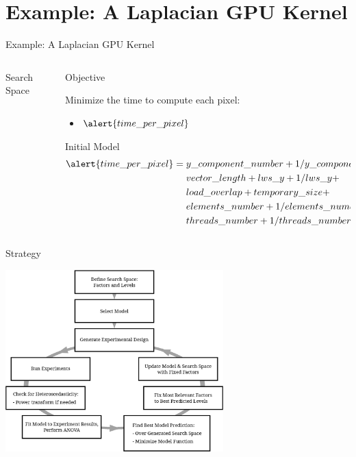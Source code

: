 \documentclass[10pt, compress, aspectratio=169, xcolor={table,usenames,dvipsnames}]{beamer}
\begin{document}
\section{Example: A Laplacian GPU Kernel}
\label{sec:org925dd6b}
\begin{frame}[label={sec:org47f7582}]{Example: A Laplacian GPU Kernel}
\begin{columns}
\begin{column}{0.5\columnwidth}
\begin{block}{Search Space}
\vspace{-.2cm}


\end{block}
\end{column}
\begin{column}{0.5\columnwidth}
\begin{block}{Objective}
\vspace{.2cm}

\alert{Minimize} the \alert{time to compute each pixel}:
\begin{itemize}
\item \(\alert{time\_per\_pixel}\)
\end{itemize}

\begin{block}{Initial Model}
\scriptsize
\begin{align*}
      \alert{time\_per\_pixel} = & \; y\_component\_number + 1 / y\_component\_number + \\
                        & \; vector\_length + lws\_y + 1 / lws\_y + \\
                        & \; load\_overlap + temporary\_size + \\
                        & \; elements\_number + 1 / elements\_number + \\
                        & \; threads\_number + 1 / threads\_number
\end{align*}
\normalsize
\end{block}
\end{block}
\end{column}
\end{columns}
\end{frame}
\begin{frame}[label={sec:orgc76ac3b}]{Strategy}
\begin{center}
\includegraphics[width=0.63\textwidth]{../img/doe_anova_strategy.eps}
\end{center}
\end{frame}
\end{document}

